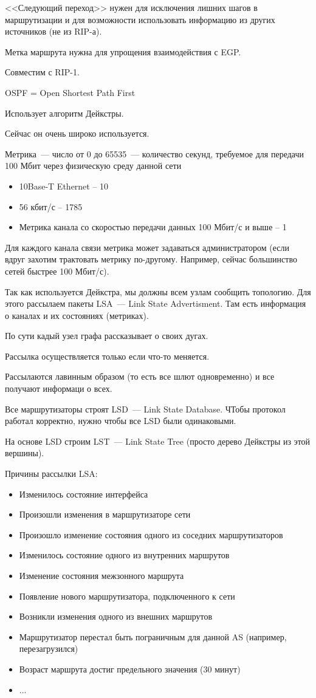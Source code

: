 <<Следующий переход>> нужен для исключения лишних шагов в маршрутизации и для возможности использовать информацию из других источников (не из RIP-а).

Метка маршрута нужна для упрощения взаимодействия с EGP.

Совместим с RIP-1.


OSPF = Open Shortest Path First

Использует алгоритм Дейкстры.

Сейчас он очень широко используется.

Метрика~--- число от 0 до 65535~--- количество секунд, требуемое для передачи 100 Мбит через физическую среду данной сети
\begin{itemize}
    \item 10Base-T Ethernet – 10
    \item 56 кбит/с – 1785
    \item Метрика канала со скоростью передачи данных 100 Мбит/с и выше – 1
\end{itemize}

Для каждого канала связи метрика может задаваться администратором (если вдруг захотим трактовать метрику по-другому. Например, сейчас большинство сетей быстрее 100 Мбит/с).

Так как используется Дейкстра, мы должны всем узлам сообщить топологию. Для этого рассылаем пакеты LSA~--- Link State Advertisment. Там есть информация о каналах и их состояниях (метриках).

По сути кадый узел графа рассказывает о своих дугах.

Рассылка осуществляется только если что-то меняется. 

Рассылаются лавинным образом (то есть все шлют одновременно) и все получают информаци о всех.

Все маршрутизаторы строят LSD~--- Link State Database. ЧТобы протокол работал корректно, нужно чтобы все LSD были одинаковыми.

На основе LSD строим LST~--- Link State Tree (просто дерево Дейкстры из этой вершины).


Причины рассылки LSA:
\begin{itemize}
    \item Изменилось состояние интерфейса
    \item Произошли изменения в маршрутизаторе сети
    \item Произошло изменение состояния одного из соседних маршрутизаторов
    \item Изменилось состояние одного из внутренних маршрутов
    \item Изменение состояния межзонного маршрута
    \item Появление нового маршрутизатора, подключенного к сети
    \item Возникли изменения одного из внешних маршрутов
    \item Маршрутизатор перестал быть пограничным для данной AS (например, перезагрузился)
    \item Возраст маршрута достиг предельного значения (30 минут)
    \item ...
\end{itemize}

